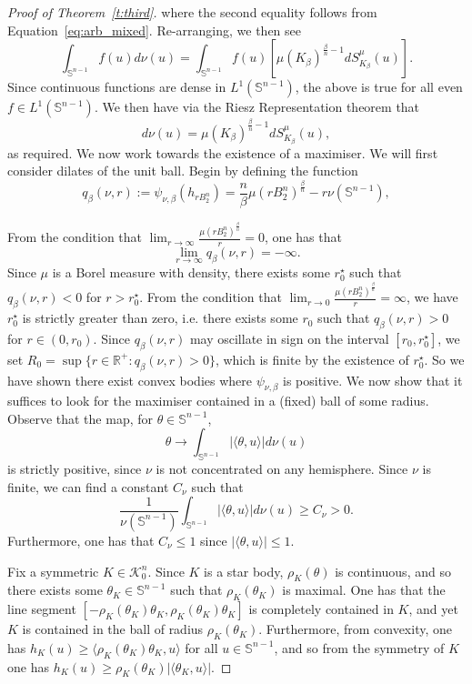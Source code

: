 \documentclass[11pt]{amsart}
\theoremstyle{definition}
\theoremstyle{remark}
\numberwithin{equation}{section}
\newcommand{\R}{\mathbb{R}}
\newcommand{\s}{\mathbb{S}}
\newcommand{\conbod}{\mathcal{K}^n}
\begin{document}
\begin{proof}[Proof of Theorem~\ref{t:third}]
where the second equality follows from Equation~\ref{eq:arb_mixed}.
Re-arranging, we then see
$$\int_{\s^{n-1}}f(u)d\nu(u)=\int_{\s^{n-1}}f(u)\left[\mu(K_\beta)^{\frac{\beta}{n}-1}dS^{\mu}_{K_{\beta}}(u)\right].$$
Since continuous functions are dense in $L^1(\s^{n-1})$, the above is true for all even $f\in L^1(\s^{n-1})$. We then have via the Riesz Representation theorem that
$$d\nu(u)=\mu(K_\beta)^{\frac{\beta}{n}-1}dS^{\mu}_{K_{\beta}}(u),$$
as required. We now work towards the existence of a maximiser. We will first consider dilates of the unit ball. Begin by defining the function
\begin{equation}
    q_{\beta}(\nu,r):=\psi_{\nu,\beta}\left(h_{rB_2^n}\right)=\frac{n}{\beta}\mu\left(rB_2^n\right)^\frac{\beta}{n}-r\nu(\s^{n-1}),
    \label{eq:qte}
\end{equation}  

From the condition that $\lim_{r\to\infty}\frac{\mu(rB_2^n)^\frac{\beta}{n}}{r} =0$, one has that $$\lim_{r\to\infty}q_{\beta}(\nu,r)=-\infty.$$ Since $\mu$ is a Borel measure with density, there exists some $r_0^\star$ such that $q_{\beta}(\nu,r)<0$ for $r>r_0^\star$. From the condition that $\lim_{r\to 0}\frac{\mu(rB_2^n)^\frac{\beta}{n}}{r} = \infty$, we have $r_0^\star$ is strictly greater than zero, i.e. there exists some $r_0$ such that $q_{\beta}(\nu,r)>0$ for $r\in(0,r_0).$
Since $q_{\beta}(\nu,r)$ may oscillate in sign on the interval $[r_0,r_0^\star]$, we set $R_0=\sup\{r\in\R^{+}:q_{\beta}(\nu,r)>0\}$, which is finite by the existence of $r_0^\star.$ So we have shown there exist convex bodies where $\psi_{\nu,\beta}$ is positive. We now show that it suffices to look for the maximiser contained in a (fixed) ball of some radius. Observe that the map, for $\theta\in\s^{n-1}$,
$$\theta\to\int_{\s^{n-1}}|\langle\theta,u\rangle|d\nu(u)$$
is strictly positive, since $\nu$ is not concentrated on any hemisphere. Since $\nu$ is finite, we can find a constant $C_\nu$ such that
$$\frac{1}{\nu(\s^{n-1})}\int_{\s^{n-1}}|\langle\theta,u\rangle|d\nu(u) \geq C_\nu >0.$$
Furthermore, one has that $C_\nu\leq1$ since $|\langle \theta, u\rangle|\leq 1$. 

Fix a symmetric $K\in\conbod_0$. Since $K$ is a star body, $\rho_K(\theta)$ is continuous, and so there exists some $\theta_K\in\s^{n-1}$ such that $\rho_K(\theta_K)$ is maximal. One has that the line segment $[-\rho_K(\theta_K)\theta_K,\rho_K(\theta_K)\theta_K]$ is completely contained in $K$, and yet $K$ is contained in the ball of radius $\rho_K(\theta_K).$ Furthermore, from convexity, one has $h_K(u)\geq \langle \rho_K(\theta_K)\theta_K, u\rangle$ for all $u\in\s^{n-1}$, and so from the symmetry of $K$ one has $h_K(u)\geq \rho_K(\theta_K)| \langle \theta_K, u\rangle|$. 


\end{proof}
\end{document}
